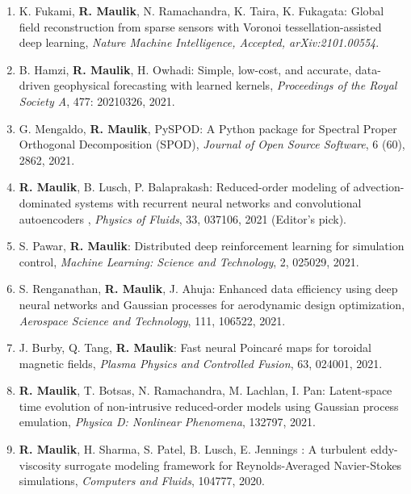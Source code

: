 \documentclass[letterpaper]{article}
\begin{document}
\begin{enumerate}

\item K. Fukami, \textbf{R. Maulik}, N. Ramachandra, K. Taira, K. Fukagata: Global field reconstruction from sparse sensors with Voronoi tessellation-assisted deep learning, {\it Nature Machine Intelligence, Accepted, arXiv:2101.00554}.

\item B. Hamzi, \textbf{R. Maulik}, H. Owhadi: Simple, low-cost, and accurate, data-driven geophysical forecasting with learned kernels, {\it Proceedings of the Royal Society A}, 477: 20210326, 2021.

\item G. Mengaldo, \textbf{R. Maulik}, PySPOD: A Python package for Spectral Proper Orthogonal Decomposition (SPOD), {\it Journal of Open Source Software}, 6 (60), 2862, 2021.

\item \textbf{R. Maulik}, B. Lusch, P. Balaprakash: Reduced-order modeling of advection-dominated systems with recurrent neural networks and convolutional autoencoders , {\it Physics of Fluids}, 33, 037106, 2021 (Editor's pick).

\item S. Pawar, \textbf{R. Maulik}: Distributed deep reinforcement learning for simulation control, {\it Machine Learning: Science and Technology}, 2, 025029, 2021.

\item S. Renganathan, \textbf{R. Maulik}, J. Ahuja: Enhanced data efficiency using deep neural networks and Gaussian processes for aerodynamic design optimization, {\it Aerospace Science and Technology}, 111, 106522, 2021.

\item J. Burby, Q. Tang, \textbf{R. Maulik}: Fast neural Poincar\'{e} maps for toroidal magnetic fields, {\it Plasma Physics and Controlled Fusion}, 63, 024001, 2021.

\item \textbf{R. Maulik}, T. Botsas, N. Ramachandra, M. Lachlan, I. Pan: Latent-space time evolution of non-intrusive reduced-order models using Gaussian process emulation, {\it Physica D: Nonlinear Phenomena}, 132797, 2021. 

\item \textbf{R. Maulik}, H. Sharma, S. Patel, B. Lusch, E. Jennings : A turbulent eddy-viscosity surrogate modeling framework for Reynolds-Averaged Navier-Stokes simulations, {\it Computers and Fluids}, 104777, 2020. 


\end{enumerate}
\end{document}
